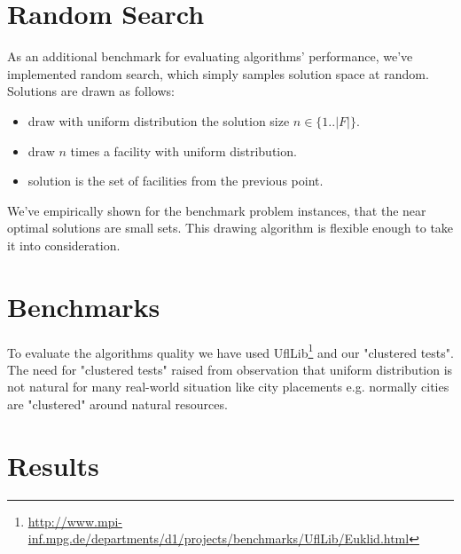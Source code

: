 \section{Random Search}

As an additional benchmark for evaluating algorithms' performance, we've implemented
random search, which simply samples solution space at random. Solutions are drawn as follows:
\begin{itemize}
\item draw with uniform distribution the solution size $n \in \{1..|F|\}$.
\item draw $n$ times a facility with uniform distribution.
\item solution is the set of facilities from the previous point.
\end{itemize}

We've empirically shown for the benchmark problem instances, that the near optimal
solutions are small sets. This drawing algorithm is flexible enough to take it
into consideration.

\section{Benchmarks}
To evaluate the algorithms quality we have used UflLib\footnote{\url{http://www.mpi-inf.mpg.de/departments/d1/projects/benchmarks/UflLib/Euklid.html}}
and our "clustered tests". The need for "clustered tests" raised from observation that
uniform distribution is not natural for many real-world situation like city placements
e.g. normally cities are "clustered" around natural resources.

\section{Results}

\begin{figure}[ht]
  
\end{figure}
